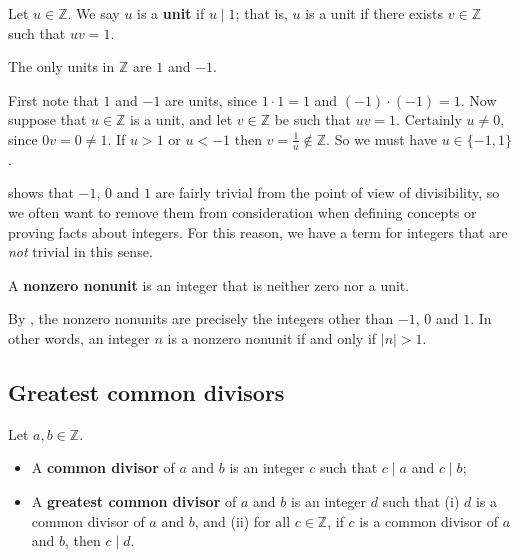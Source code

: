 \begin{definition}
Let $u \in \mathbb{Z}$. We say $u$ is a \textbf{unit} if $u \mid 1$; that is, $u$ is a unit if there exists $v \in \mathbb{Z}$ such that $uv=1$.
\end{definition}

\begin{proposition}
\label{propUnitsOfZ}
The only units in $\mathbb{Z}$ are $1$ and $-1$.
\end{proposition}
\begin{cproof}
First note that $1$ and $-1$ are units, since $1 \cdot 1 = 1$ and $(-1) \cdot (-1) = 1$. Now suppose that $u \in \mathbb{Z}$ is a unit, and let $v \in \mathbb{Z}$ be such that $uv=1$. Certainly $u \ne 0$, since $0v=0 \ne 1$. If $u>1$ or $u<-1$ then $v = \frac{1}{u} \not \in \mathbb{Z}$. So we must have $u \in \{ -1, 1 \}$.
\end{cproof}

 shows that $-1$, $0$ and $1$ are fairly trivial from the point of view of divisibility, so we often want to remove them from consideration when defining concepts or proving facts about integers. For this reason, we have a term for integers that are \textit{not} trivial in this sense.

\begin{definition}
\label{defNonZeroNonUnit}
A \textbf{nonzero nonunit} is an integer that is neither zero nor a unit.
\end{definition}

By , the nonzero nonunits are precisely the integers other than $-1$, $0$ and $1$. In other words, an integer $n$ is a nonzero nonunit if and only if $|n| > 1$.

\subsection*{Greatest common divisors}

\begin{definition}
\label{defGCD}
Let $a, b \in \mathbb{Z}$.
\begin{itemize}
\item A \textbf{common divisor} of $a$ and $b$ is an integer $c$ such that $c \mid a$ and $c \mid b$;
\item A \textbf{greatest common divisor} of $a$ and $b$ is an integer $d$ such that (i) $d$ is a common divisor of $a$ and $b$, and (ii) for all $c \in \mathbb{Z}$, if $c$ is a common divisor of $a$ and $b$, then $c \mid d$.
\end{itemize}
\end{definition}

